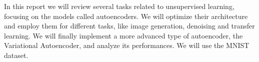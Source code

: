 In this report we will review several tasks related to unsupervised learning, focusing on the models called autoencoders.
We will optimize their architecture and employ them for different tasks, like image generation, denoising and transfer learning. We will 
finally implement a more advanced type of autoencoder, the Variational Autoencoder, and analyze its performances. We will use the
MNIST dataset.